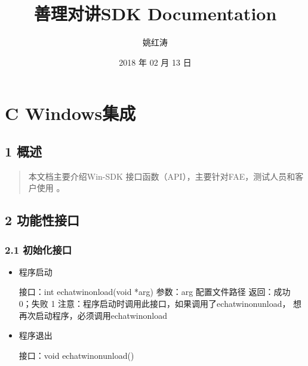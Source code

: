 \documentclass[letterpaper,10pt,english]{sphinxmanual}
\title{善理对讲SDK Documentation}
\date{2018 年 02 月 13 日}
\author{姚红涛}
\begin{document}
\maketitle
\sphinxtableofcontents
{}\label{\detokenize{index::doc}}



\chapter{C Windows集成}
\label{\detokenize{index:c-windows}}\label{\detokenize{index:sdk}}

\section{1 概述}
\label{\detokenize{c_win::doc}}\label{\detokenize{c_win:id1}}\begin{quote}

本文档主要介绍Win-SDK
接口函数（API），主要针对FAE，测试人员和客户使用 。
\end{quote}


\section{2 功能性接口}
\label{\detokenize{c_win:id2}}

\subsection{2.1 初始化接口}
\label{\detokenize{c_win:id3}}\begin{itemize}
\item {} 
程序启动

%
\begin{sphinxVerbatim}[commandchars=\\\{\}]
接口：int echat\PYGZus{}win\PYGZus{}on\PYGZus{}load(void *arg)
参数：arg 配置文件路径
返回：成功 0；失败 \PYGZhy{}1
注意：程序启动时调用此接口，如果调用了echat\PYGZus{}win\PYGZus{}on\PYGZus{}unload， 想再次启动程序，必须调用echat\PYGZus{}win\PYGZus{}on\PYGZus{}load
\end{sphinxVerbatim}

\item {} 
程序退出

%
\begin{sphinxVerbatim}[commandchars=\\\{\}]
接口：void echat\PYGZus{}win\PYGZus{}on\PYGZus{}unload()
\end{sphinxVerbatim}

\end{itemize}
\end{document}
